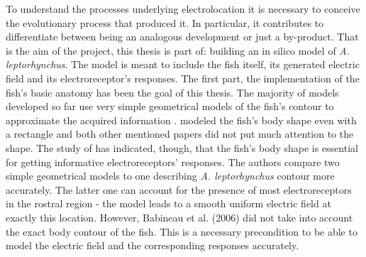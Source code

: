 To understand the processes underlying electrolocation it is necessary to conceive the evolutionary process that produced it. In particular, it contributes to differentiate between being an analogous development or just a by-product. That is the aim of the project, this thesis is part of: building an in silico model of \textit{A. leptorhynchus}. The model is meant to include the fish itself, its generated electric field and its electroreceptor's responses. The first part, the implementation of the fish's basic anatomy has been the goal of this thesis. The majority of models developed so far use very simple geometrical models of the fish's contour to approximate the acquired information \cite[among others]{bacher1983new, chen2005modeling}.  modeled the fish's body shape even with a rectangle and both other mentioned papers did not put much attention to the shape. The study of  has indicated, though, that the fish's body shape is essential for getting informative electroreceptors' responses. The authors compare two simple geometrical models to one describing \textit{A. leptorhynchus} contour more accurately. The latter one can account for the presence of most electroreceptors in the rostral region - the model leads to a smooth uniform electric field at exactly this location. However, Babineau et al. (2006) did not take into account the exact body contour of the fish. This is a necessary precondition to be able to model the electric field and the corresponding responses accurately. 


